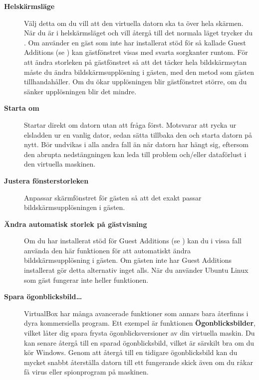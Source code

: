 \documentclass[a4paper,final]{memoir} %
\begin{document}
\begin{description}

\item[\textbf{Helskärmsläge}] Välj detta om du vill att den virtuella datorn ska ta över hela skärmen. När du är i helskärmsläget och vill återgå till det normala läget trycker du . Om använder en gäst som inte har installerat stöd för så kallade Guest Additions (se ) kan gästfönstret visas med svarta sorgkanter runtom. För att ändra storleken på gästfönstret så att det täcker hela bildskärmsytan måste du ändra bildskärmsupplösning i gästen, med den metod som gästen tillhandahåller. Om du ökar upplösningen blir gästfönstret större, om du sänker upplösningen blir det mindre.

\item[\textbf{Starta om}] Startar direkt om datorn utan att fråga först. Motsvarar att rycka ur elsladden ur en vanlig dator, sedan sätta tillbaka den och starta datorn på nytt. Bör undvikas i alla andra fall än när datorn har hängt sig, eftersom den abrupta nedstängningen kan leda till problem och/eller dataförlust i den virtuella maskinen.

\item[\textbf{Justera fönsterstorleken}] Anpassar skärmfönstret för gästen så att det exakt passar bildskärmsupplösningen i gästen.

\item[\textbf{Ändra automatisk storlek på gästvisning}] Om du har installerat stöd för Guest Additions (se ) kan du i vissa fall använda den här funktionen för att automatiskt ändra bildskärmsupplösning i gästen. Om gästen inte har Guest Additions installerat gör detta alternativ inget alls. När du använder Ubuntu Linux som gäst fungerar inte heller funktionen.

\item[\textbf{Spara ögonblicksbild\ldots{}}] VirtualBox har många avancerade funktioner som annars bara återfinns i dyra kommersiella program. Ett exempel är funktionen \textbf{Ögonblicksbilder}, vilket låter dig spara frysta ögonblicksversioner av din virtuella maskin. Du kan senare återgå till en sparad ögonblicksbild, vilket är särskilt bra om du kör Windows. Genom att återgå till en tidigare ögonblicksbild kan du mycket snabbt återställa datorn till ett fungerande skick även om du råkar få virus eller spionprogram på maskinen.


\end{description}
\end{document}
